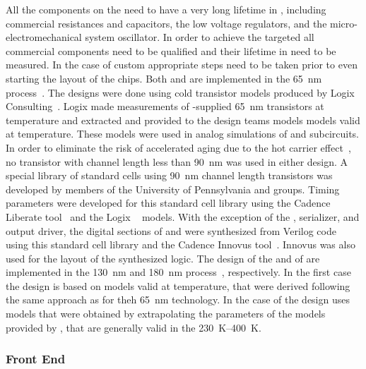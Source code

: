 All the components on the  need to have a very long lifetime
in , including commercial resistances and capacitors, the
low voltage regulators, and the micro-electromechanical system oscillator.
In order to achieve the targeted \dunelifetime all commercial components 
need to be qualified and their lifetime in  need to be measured. 
In the case of custom  appropriate steps need to be taken prior 
to even starting the layout of the chips. Both  and 
 are implemented in the  \SI{65}{nm}  
process~\cite{TSMC65}. The designs were done using cold transistor models 
produced by Logix Consulting~\cite{Logix}.  Logix made measurements of 
-supplied  \SI{65}{nm} transistors at \lntwo 
temperature and extracted and provided to the design teams  
models models valid at \lntwo temperature.  These models were used in 
analog simulations of  and  subcircuits.  
In order to eliminate the risk of accelerated aging due to the hot carrier
effect~\cite{Hot-electron}, no transistor with channel length
less than \SI{90}{nm} was used in either  design.
A special library of standard cells using \SI{90}{nm} channel
length transistors was developed by members of the University
of Pennsylvania and  groups. Timing parameters were
developed for this standard cell library using the Cadence Liberate
tool~\cite{Liberate} and the Logix ~\cite{spice} models. With the
exception of the  , serializer, and
output driver, the digital sections of  and
 were synthesized from Verilog code using this
standard cell library and the Cadence Innovus tool~\cite{Innovus}.
Innovus was also used for the layout of the synthesized logic.
The design of the   and of 
are implemented in the  \SI{130}{nm} and \SI{180}{nm} 
 process~\cite{TSMC130,TSMC180}, respectively. In the
first case the design is based on  models valid at
\lntwo temperature, that were derived following the same approach
as for theh \SI{65}{nm} technology. In the case of 
the design uses models that were obtained by extrapolating the
parameters of the models provided by , that are 
generally valid in the \SIrange{230}{400}{K}.

\subsubsection{Front End }
\label{sec:fdsp-tpcelec-design-femb-fe}

